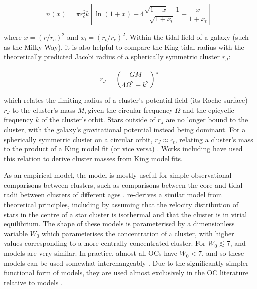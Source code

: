 \begin{equation}
	n(x) = \pi r_c^2 k \left[ \ln(1+x) - 4 \frac{\sqrt{1+x} - 1}{\sqrt{1 + x_t}} + \frac{x}{1 + x_t} \right]
\end{equation}

\noindent
where $x = (r / r_c)^2$ and $x_t = (r_t / r_c)^2$. Within the tidal field of a galaxy (such as the Milky Way), it is also helpful to compare the King tidal radius with the theoretically predicted Jacobi radius of a spherically symmetric cluster $r_J$:

\begin{equation}
	r_J = \left( \frac{GM}{4\Omega^2 - k^2} \right)^{\frac{1}{3}}
	\label{eqn:intro:jacobi_radius}
\end{equation}

\noindent %
which relates the limiting radius of a cluster's potential field (its Roche surface) $r_J$ to the cluster's mass $M$, given the circular frequency $\Omega$ and the epicyclic frequency $k$ of the cluster's orbit. Stars outside of $r_J$ are no longer bound to the cluster, with the galaxy's gravitational potential instead being dominant. For a spherically symmetric cluster on a circular orbit, $r_J \approx r_t$, relating a cluster's mass to the product of a King model fit (or vice versa) . Works including  have used this relation to derive cluster masses from King model fits.

As an empirical model, the \cite{king_structure_star_1962} model is mostly useful for simple observational comparisons between clusters, such as comparisons between the core and tidal radii between clusters of different ages \citep{kharchenko_global_2013,tarricq_structural_2022}. \cite{king_structure_1966} re-derives a similar model from theoretical principles, including by assuming that the velocity distribution of stars in the centre of a star cluster is isothermal and that the cluster is in virial equilibrium. The shape of these models is parameterised by a dimensionless variable $W_0$ which parameterises the concentration of a cluster, with higher values corresponding to a more centrally concentrated cluster. For $W_0 \lesssim 7$, \cite{king_structure_star_1962} and \cite{king_structure_1966} models are very similar. In practice, almost all OCs have $W_0 < 7$, and so these models can be used somewhat interchangeably \citep{portegies_zwart_young_2010}. Due to the significantly simpler functional form of \cite{king_structure_star_1962} models, they are used almost exclusively in the OC literature relative to \cite{king_structure_1966} models \citep{portegies_zwart_young_2010,cantat-gaudin_milky_2022}.

